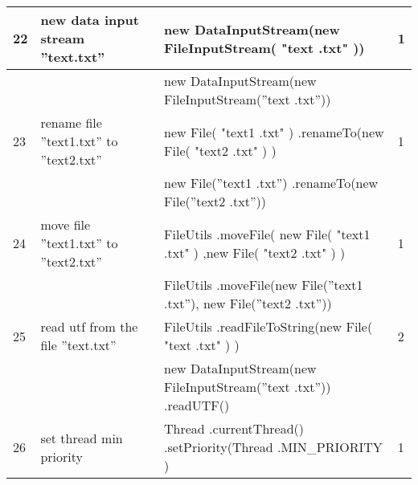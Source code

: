 \begin{longtable}{|p{}|p{}|p{}|p{}|}
		\rowcolor[HTML]{FFCCC9} 
		22                                & new data input stream ”text.txt”                       & new DataInputStream(new FileInputStream( "text .txt" ))                                                          & 1                                       \\ \hline
		\rowcolor[HTML]{9AFF99} 
		&                                                        & new DataInputStream(new FileInputStream(”text .txt”))                                                            &                                         \\ \hline
		\rowcolor[HTML]{FFCCC9} 
		23                                & rename file ”text1.txt” to ”text2.txt”                 & new File( "text1 .txt" )  .renameTo(new File( "text2 .txt" ) )                                                   & 1                                       \\ \hline
		\rowcolor[HTML]{9AFF99} 
		&                                                        & new File(”text1 .txt”) .renameTo(new File(”text2 .txt”))                                                         &                                         \\ \hline
		\rowcolor[HTML]{FFCCC9} 
		24                                & move file ”text1.txt” to ”text2.txt”                   & FileUtils .moveFile( new File( "text1 .txt" ) ,new File( "text2 .txt" ) )                                        & 1                                       \\ \hline
		\rowcolor[HTML]{9AFF99} 
		&                                                        & FileUtils .moveFile(new File(”text1 .txt”), new File(”text2 .txt”))                                              &                                         \\ \hline
		\rowcolor[HTML]{FFCCC9} 
		25                                & read utf from the file ”text.txt”                      & FileUtils .readFileToString(new File( "text .txt" ) )                                                            & 2                                       \\ \hline
		\rowcolor[HTML]{9AFF99} 
		&                                                        & new DataInputStream(new FileInputStream(”text .txt”)) .readUTF()                                                 &                                         \\ \hline
		\rowcolor[HTML]{FFCCC9} 
		26                                & set thread min priority                                & Thread .currentThread() .setPriority(Thread .MIN\_PRIORITY )                                                     & 1                                       \\ \hline

\end{longtable}
